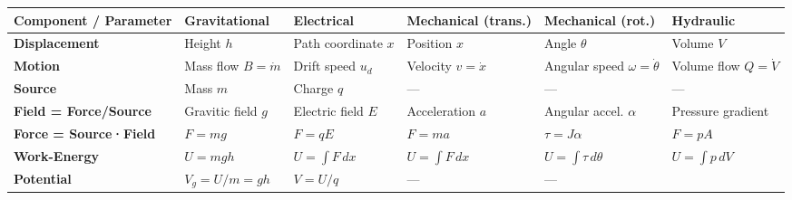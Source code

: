 \documentclass[
]{article}
\begin{document}
\begin{longtable}[]{@{}
  >{\raggedright\arraybackslash}p{}
  >{\raggedright\arraybackslash}p{}
  >{\raggedright\arraybackslash}p{}
  >{\raggedright\arraybackslash}p{}
  >{\raggedright\arraybackslash}p{}
  >{\raggedright\arraybackslash}p{}@{}}
\toprule\noalign{}
\begin{minipage}[b]{\linewidth}\raggedright
Component / Parameter
\end{minipage} & \begin{minipage}[b]{\linewidth}\raggedright
Gravitational
\end{minipage} & \begin{minipage}[b]{\linewidth}\raggedright
Electrical
\end{minipage} & \begin{minipage}[b]{\linewidth}\raggedright
Mechanical (trans.)
\end{minipage} & \begin{minipage}[b]{\linewidth}\raggedright
Mechanical (rot.)
\end{minipage} & \begin{minipage}[b]{\linewidth}\raggedright
Hydraulic
\end{minipage} \\
\midrule\noalign{}
\endhead
\bottomrule\noalign{}
\endlastfoot
\textbf{Displacement} & Height \(h\) & Path coordinate \(x\) & Position
\(x\) & Angle \(\theta\) & Volume \(V\) \\
\textbf{Motion} & Mass flow \(B=\dot{m}\) & Drift speed \(u_d\) &
Velocity \(v=\dot{x}\) & Angular speed \(\omega=\dot{\theta}\) & Volume
flow \(Q=\dot{V}\) \\
\textbf{Source} & Mass \(m\) & Charge \(q\) & --- & --- & --- \\
\textbf{Field = Force/Source} & Gravitic field \(g\) & Electric field
\(E\) & Acceleration \(a\) & Angular accel. \(\alpha\) & Pressure
gradient \\
\textbf{Force = Source·Field} & \(F=mg\) & \(F=qE\) & \(F=ma\) &
\(\tau=J\alpha\) & \(F=pA\) \\
\textbf{Work-Energy} & \(U=mgh\) & \(U=\int F\,dx\) & \(U=\int F\,dx\) &
\(U=\int \tau\,d\theta\) & \(U=\int p\,dV\) \\
\textbf{Potential} & \(V_g=U/m=gh\) & \(V=U/q\) & --- & --- &

\end{longtable}
\end{document}

